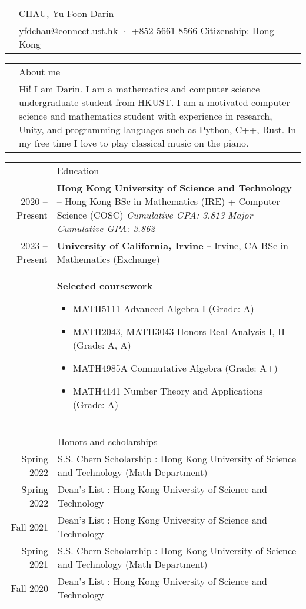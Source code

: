 \documentclass[letterpaper, 11pt]{article}
\newcommand{\headingfont}{\Large\color{OliveGreen}}
\newenvironment{SectionTable}[1]{
	\renewcommand*{\arraystretch}{1.7}
	\setlength{\tabcolsep}{10pt}
	\begin{longtable}{Rp{5.2in}} & #1 \\}
{\end{longtable}\vspace{-.3cm}}
\newenvironment{SectionTableSingleSpace}[1]{
	\renewcommand*{\arraystretch}{1.2}
	\setlength{\tabcolsep}{10pt}
	\begin{longtable}{Rp{5.2in}} & #1 \\[0.6em]}
{\end{longtable}\vspace{-.3cm}}
\begin{document}
\begin{SectionTable}{\Huge CHAU, Yu Foon Darin} & 
yfdchau@connect.ust.hk   $\;\boldsymbol{\cdot}\;$ 
+852 5661 8566 \newline
Citizenship: Hong Kong
\end{SectionTable}

\begin{SectionTable}{\headingfont About me}
&
Hi! I am Darin. I am a mathematics and computer science undergraduate student from HKUST. I am a motivated computer science and mathematics student with experience in research, Unity, and programming languages such as Python, C++, Rust. In my free time I love to play classical music on the piano.
\end{SectionTable}

\begin{SectionTable}{\headingfont Education}
2020 -- Present & 
\textbf{Hong Kong University of Science and Technology} -- Hong Kong \newline
BSc in Mathematics (IRE) + Computer Science (COSC) \newline 
\textit{Cumulative GPA: 3.813} \newline
\textit{Major Cumulative GPA: 3.862}\\
2023 -- Present & 
\textbf{University of California, Irvine} -- Irvine, CA \newline
BSc in Mathematics (Exchange) \newline 
\\
& \textbf{Selected coursework}
\begin{itemize}[itemsep=0pt, leftmargin=*]
\item MATH5111 Advanced Algebra I (Grade: A)
\item MATH2043, MATH3043 Honors Real Analysis I, II (Grade: A, A)
\item MATH4985A Commutative Algebra (Grade: A+)
\item MATH4141 Number Theory and Applications (Grade: A)
\end{itemize}
\end{SectionTable}

\begin{SectionTableSingleSpace}{\headingfont Honors and scholarships}
Spring 2022 & 
S.S. Chern Scholarship : Hong Kong University of Science and Technology (Math Department) 
\\
Spring 2022 & 
Dean's List : Hong Kong University of Science and Technology
\\
Fall 2021 & 
Dean's List : Hong Kong University of Science and Technology
\\
Spring 2021 & 
S.S. Chern Scholarship : Hong Kong University of Science and Technology (Math Department) 
\\
Fall 2020 & 
Dean's List : Hong Kong University of Science and Technology
\end{SectionTableSingleSpace}
\end{document}
